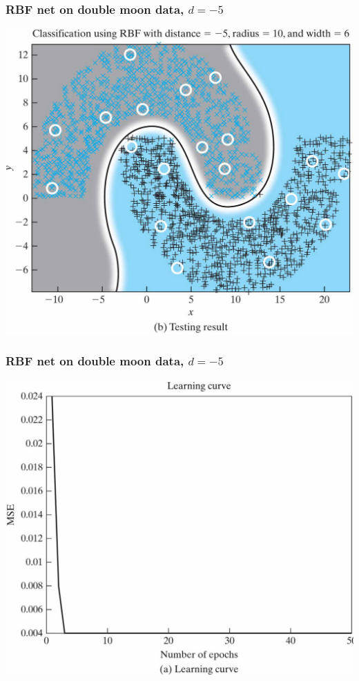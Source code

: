 \documentclass[12pt,notes,mathserif]{beamer}
\begin{document}
\begin{frame}
	\frametitle{RBF net on double moon data, $d=-5$}
	\begin{center}
		\includegraphics[width=0.8\linewidth]{fig/lec739.jpg}
	\end{center}
\end{frame}


\begin{frame}
	\frametitle{RBF net on double moon data, $d=-5$}
	\begin{center}
		\includegraphics[width=0.8\linewidth]{fig/lec740.jpg}
	\end{center}
\end{frame}
\end{document}
